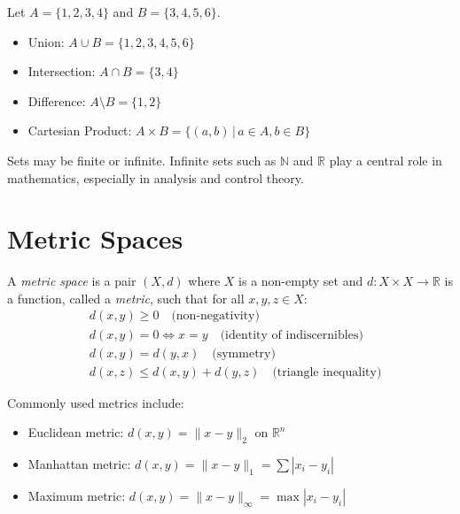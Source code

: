\begin{example}
Let $A = \{1,2,3,4\}$ and $B = \{3,4,5,6\}$.  
\begin{itemize}
    \item Union: $A \cup B = \{1,2,3,4,5,6\}$  
    \item Intersection: $A \cap B = \{3,4\}$  
    \item Difference: $A \setminus B = \{1,2\}$  
    \item Cartesian Product: $A \times B = \{(a,b)\,|\, a \in A, b \in B\}$  
\end{itemize}
\end{example}

\begin{remark}
Sets may be finite or infinite. Infinite sets such as $\mathbb{N}$ and $\mathbb{R}$ play a central role in mathematics, especially in analysis and control theory.
\end{remark}

\section{Metric Spaces}

\begin{definition}
A \emph{metric space} is a pair $(X,d)$ where $X$ is a non-empty set and 
$d : X \times X \to \mathbb{R}$ is a function, called a \emph{metric}, such that for all $x,y,z \in X$:
\begin{align}
    & d(x,y) \geq 0 \quad \text{(non-negativity)} \\
    & d(x,y) = 0 \iff x=y \quad \text{(identity of indiscernibles)} \\
    & d(x,y) = d(y,x) \quad \text{(symmetry)} \\
    & d(x,z) \leq d(x,y) + d(y,z) \quad \text{(triangle inequality)}
\end{align}
\end{definition}

\begin{notation}
Commonly used metrics include:
\begin{itemize}
    \item Euclidean metric: $d(x,y) = \|x-y\|_2$ on $\mathbb{R}^n$  
    \item Manhattan metric: $d(x,y) = \|x-y\|_1 = \sum |x_i - y_i|$  
    \item Maximum metric: $d(x,y) = \|x-y\|_\infty = \max |x_i - y_i|$  
\end{itemize}
\end{notation}

